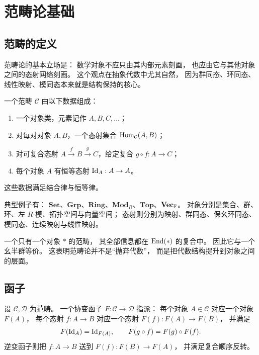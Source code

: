 \chapter{范畴论基础}

\section{范畴的定义}

范畴论的基本立场是：
数学对象不应只由其内部元素刻画，
也应由它与其他对象之间的态射网络刻画。
这个观点在抽象代数中尤其自然，
因为群同态、环同态、线性映射、模同态本来就是结构保持的核心。

\begin{definition}
一个范畴 $\mathcal{C}$ 由以下数据组成：
\begin{enumerate}[label=(\roman*), leftmargin=*]
\item 一个对象类，元素记作 $A,B,C,\dots$；
\item 对每对对象 $A,B$，一个态射集合 $\mathrm{Hom}_{\mathcal{C}}(A,B)$；
\item 对可复合态射 $A\xrightarrow{f}B\xrightarrow{g}C$，给定复合 $g\circ f:A\to C$；
\item 每个对象 $A$ 有恒等态射 $\mathrm{Id}_A:A\to A$。
\end{enumerate}
这些数据满足结合律与恒等律。
\end{definition}

\begin{example}
典型例子有：
$\mathbf{Set}$、$\mathbf{Grp}$、$\mathbf{Ring}$、$\mathbf{Mod}_R$、$\mathbf{Top}$、$\mathbf{Vec}_{\mathbb{F}}$。
对象分别是集合、群、环、左 $R$-模、拓扑空间与向量空间；
态射则分别为映射、群同态、保幺环同态、模同态、连续映射与线性映射。
\end{example}

\begin{remark}
一个只有一个对象 $\ast$ 的范畴，
其全部信息都在 $\mathrm{End}(\ast)$ 的复合中。
因此它与一个幺半群等价。
这表明范畴论并不是“抛弃代数”，
而是把代数结构提升到对象之间的层面。
\end{remark}

\section{函子}

\begin{definition}
设 $\mathcal{C},\mathcal{D}$ 为范畴。
一个协变函子 $F:\mathcal{C}\to\mathcal{D}$ 指派：
每个对象 $A\in\mathcal{C}$ 对应一个对象 $F(A)$，
每个态射 $f:A\to B$ 对应一个态射 $F(f):F(A)\to F(B)$，
并满足
\[
F(\mathrm{Id}_A)=\mathrm{Id}_{F(A)},
\qquad
F(g\circ f)=F(g)\circ F(f).
\]
逆变函子则把 $f:A\to B$ 送到
$F(f):F(B)\to F(A)$，
并满足复合顺序反转。
\end{definition}

